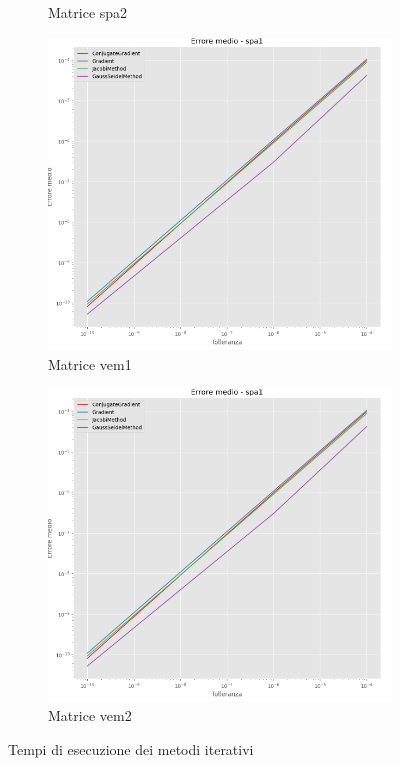 \begin{figure}[!ht]
\begin{subfigure}{0.45\textwidth}
        \caption{Matrice spa2}
        \label{fig:time_spa2}
    \end{subfigure}
    \hfill
    \begin{subfigure}{0.45\textwidth}
        \centering
        \includegraphics[width=\textwidth]{./img/error_spa1.png}
        \caption{Matrice vem1}
        \label{fig:time_vem1}
    \end{subfigure}
    \hfill
    \begin{subfigure}{0.45\textwidth}
        \centering
        \includegraphics[width=\textwidth]{./img/error_spa1.png}
        \caption{Matrice vem2}
        \label{fig:time_vem2}
    \end{subfigure}
    \caption{Tempi di esecuzione dei metodi iterativi}
    \label{fig:time}
\end{figure}

